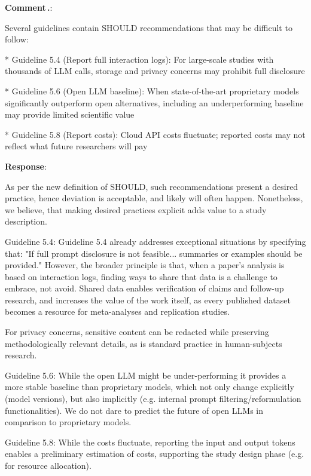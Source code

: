 \documentclass[11pt]{article}
\makeatletter
\newcounter{reviewer}
\newcounter{comment}[reviewer]
\renewcommand{\thecomment}{Comment\,\thereviewer.\arabic{comment}}
\newenvironment{reviewcomment}
{%
  \refstepcounter{comment}%
  \begingroup
    \edef\@tempa{comment:\thereviewer.\arabic{comment}}%
    \label{\@tempa}%
  \endgroup
  \needspace{8\baselineskip}%
  \bigskip\noindent
  \textbf{\thecomment}:%
  \begin{commentquote}{}%
}%
{%
  \end{commentquote}%
  \medskip\par
}
\newenvironment{response}
{%
  \needspace{6\baselineskip}%
  \par\medskip\noindent\textbf{Response}:\\%
  \phantomsection%
  \begingroup
    \edef\@tempa{response:\thereviewer.\arabic{comment}}%
    \label{\@tempa}%
  \endgroup
}
{%
  \medskip\par
}
\makeatother
\begin{document}
\begin{reviewcomment}
Several guidelines contain SHOULD recommendations that may be difficult to follow:

* Guideline 5.4 (Report full interaction logs): For large-scale studies with thousands of LLM calls, storage and privacy concerns may prohibit full disclosure

* Guideline 5.6 (Open LLM baseline): When state-of-the-art proprietary models significantly outperform open alternatives, including an underperforming baseline may provide limited scientific value

* Guideline 5.8 (Report costs): Cloud API costs fluctuate; reported costs may not reflect what future researchers will pay
\end{reviewcomment}
\begin{response}
As per the new definition of SHOULD, such recommendations present a desired practice, hence deviation is acceptable, and likely will often happen. Nonetheless, we believe, that making desired practices explicit adds value to a study description.

Guideline 5.4: Guideline 5.4 already addresses exceptional situations by specifying that: "If full prompt disclosure is not feasible... summaries or examples should be provided."
However, the broader principle is that, when a paper's analysis is based on interaction logs, finding ways to share that data is a challenge to embrace, not avoid. Shared data enables verification of claims and follow-up research, and increases the value of the work itself, as every published dataset becomes a resource for meta-analyses and replication studies.

For privacy concerns, sensitive content can be redacted while preserving methodologically relevant details, as is standard practice in human-subjects research.

Guideline 5.6: While the open LLM might be under-performing it provides a more stable baseline than proprietary models, which not only change explicitly (model versions), but also implicitly (e.g. internal prompt filtering/reformulation functionalities). We do not dare to predict the future of open LLMs in comparison to proprietary models.

Guideline 5.8: While the costs fluctuate, reporting the input and output tokens enables a preliminary estimation of costs, supporting the study design phase (e.g. for resource allocation).


\end{response}
\end{document}
